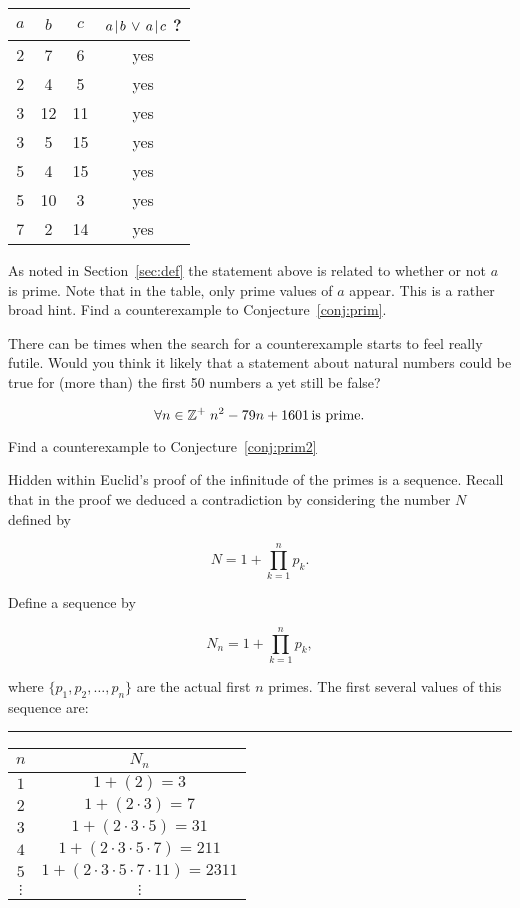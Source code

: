 \begin{center}
\begin{tabular}{c|c|c|c}
$a$ & $b$ & $c$ & $ a \!\mid\! b \, \lor \, a \!\mid\! c $ ? \\ \hline
2 & 7 & 6 & yes \\  
2 & 4 & 5 & yes \\  
3 & 12 & 11 & yes \\
3 & 5 & 15 & yes \\
5 & 4 & 15 & yes \\
5 & 10 & 3 & yes \\
7 & 2 & 14 & yes \\
\end{tabular}
\end{center}

\begin{exer} 
As noted in Section~\ref{sec:def} the statement above is related to
whether or not $a$ is prime.  Note that in the table, only prime
values of $a$ appear.  This is a rather broad hint.  Find a 
counterexample to Conjecture~\ref{conj:prim}.
\end{exer}

There can be times when the search for a counterexample starts to feel
really futile.  Would you think it likely that a statement about
natural numbers could be true for (more than) the first 50 numbers
a yet still be false?  

\begin{conj}
\label{conj:prim2}
\[ \forall n \in {\mathbb Z}^+ \; n^2 - 79n + 1601 \, \mbox{is prime.} \]
\end{conj}

\begin{exer}
Find a counterexample to Conjecture~\ref{conj:prim2}
\end{exer}

Hidden within Euclid's proof of the infinitude of the primes is
a sequence.  Recall that in the proof we deduced a contradiction
by considering the number $N$ defined by 

\[  N = 1 + \prod_{k=1}^n p_k. \]

Define a sequence by

\[  N_n  = 1 + \prod_{k=1}^n p_k, \]

where $\{p_1, p_2, \ldots , p_n\}$ are the actual first $n$ primes.
The first several values of this sequence are:

\rule{72pt}{0pt} \begin{tabular}{c|c}
 $n$ & $N_n$ \\ \hline
 $1$ & $1+(2) = 3$ \\
 $2$ & $1+(2\cdot 3) = 7$\\
 $3$ & $1+(2\cdot 3\cdot 5) = 31$\\
 $4$ & $1+(2\cdot 3\cdot 5\cdot 7) = 211$\\
 $5$ & $1+(2\cdot 3\cdot 5\cdot 7\cdot 11) = 2311$\\
$\vdots$ & $\vdots$ \\
\end{tabular}

